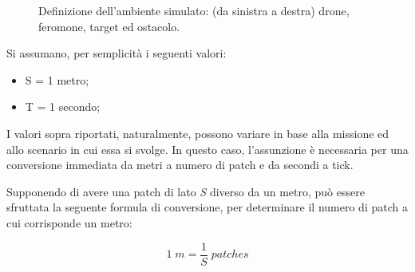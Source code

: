 \begin{figure}[H] 
    \captionsetup{justification=centering, margin=2cm, font=footnotesize}
    \begin{center}
    \end{center}
    \caption[short]{Definizione dell'ambiente simulato: (da sinistra a destra) drone, feromone, target ed ostacolo.}
    \label{elementi_ambiente}
\end{figure}

Si assumano, per semplicità i seguenti valori:
\begin{itemize}
    \item S = 1 metro;
    \item T = 1 secondo; 
\end{itemize}

I valori sopra riportati, naturalmente, possono variare in base alla missione ed allo scenario in cui essa si svolge.
In questo caso, l'assunzione è necessaria per una conversione immediata da metri a numero di patch e da secondi a tick.

Supponendo di avere una patch di lato \textit{S} diverso da un metro, può essere sfruttata la seguente formula di conversione, per determinare il numero di patch a cui corrisponde un metro:

\begin{equation}
    \label{m_patches}
    1 \; m = \frac{1}{S} \; patches
\end{equation}

